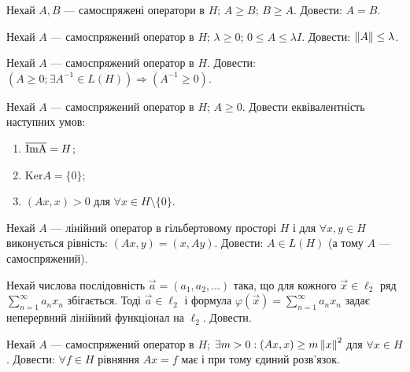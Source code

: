 
\begin{exercise}
    Нехай $A, B$ --- самоспряжені оператори в $H$; $A \geq B$; $B \geq A$.
    Довести: $A = B$.
\end{exercise}

\begin{exercise}
    Нехай $A$ --- самоспряжений оператор в $H$; $\lambda \geq 0$; $0 \leq A \leq \lambda I$.
    Довести: $\left\lVert A\right\rVert \leq \lambda$.
\end{exercise}

\begin{exercise}
    Нехай $A$ --- самоспряжений оператор в $H$. Довести:
    $ (A \geq 0; \exists A^{-1} \in L(H)) \Rightarrow (A^{-1} \geq 0)$.
\end{exercise}

\begin{exercise}
    Нехай $A$ --- самоспряжений оператор в $H$; $A \geq 0$. Довести еквівалентність наступних умов:
    \begin{enumerate}[label=\ukr*)]
        \item $\overline{\rm \mathrm{Im}A} = H$;
        \item $\mathrm{Ker}A = \{0\}$;
        \item $(Ax, x) > 0$ для $\forall x \in H \setminus \{0\}$.
    \end{enumerate}
\end{exercise}

\begin{exercise}\label{N:1_3_39}
    Нехай $A$ --- лінійний оператор в гільбертовому просторі $H$ і для $\forall x, y \in H$ виконується
    рівність: $(Ax, y) = (x, Ay)$. Довести: $A \in L(H)$ (а тому $A$ --- самоспряжений).
\end{exercise}

\begin{exercise}
    Нехай числова послідовність $\vec{a} = (a_1, a_2, \dots)$ така, що для кожного $\vec{x} \in \ell_2$
    ряд $\sum\limits_{n = 1}^\infty a_n x_n$ збігається. Тоді $\vec{a} \in \ell_2$ і формула 
    $\varphi(\vec{x}) = \sum\limits_{n = 1}^\infty a_n x_n$ задає неперервний лінійний функціонал на $\ell_2$.
    Довести.
\end{exercise}

\begin{exercise}\label{N:1_3_41}
    Нехай $A$ --- самоспряжений оператор в $H$; $\exists m > 0: (Ax, x) \geq m \left\lVert x\right\rVert^2$ для $\forall x \in H$.
    Довести: $\forall f \in H$ рівняння $Ax = f$ має і при тому єдиний розв'язок.
\end{exercise}

